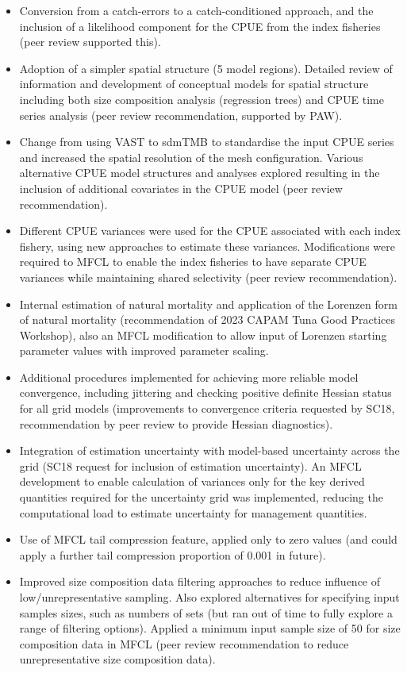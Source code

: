 \begin{itemize}
  \item Conversion from a catch-errors to a catch-conditioned approach, and the inclusion of a likelihood component for the CPUE from the index fisheries (peer review supported this).
  \item Adoption of a simpler spatial structure (5 model regions). Detailed review of information and development of conceptual models for spatial structure including both size composition analysis (regression trees) and CPUE time series analysis (peer review recommendation, supported by PAW).
  \item Change from using VAST to sdmTMB to standardise the input CPUE series and increased the spatial resolution of the mesh configuration. Various alternative CPUE model structures and analyses explored resulting in the inclusion of additional covariates in the CPUE model (peer review recommendation).
  \item Different CPUE variances were used for the CPUE associated with each index fishery, using new approaches to estimate these variances. Modifications were required to MFCL to enable the index fisheries to have separate CPUE variances while maintaining shared selectivity  (peer review recommendation).
  \item Internal estimation of natural mortality and application of the Lorenzen form of natural mortality (recommendation of 2023 CAPAM Tuna Good Practices Workshop), also an MFCL modification to allow input of Lorenzen starting parameter values with improved parameter scaling.
  \item Additional procedures implemented for achieving more reliable model convergence, including jittering and checking positive definite Hessian status for all grid models (improvements to convergence criteria requested by SC18, recommendation by peer review to provide Hessian diagnostics).
  \item Integration of estimation uncertainty with model-based uncertainty across the grid (SC18 request for inclusion of estimation uncertainty). An MFCL development to enable calculation of variances only for the key derived quantities required for the uncertainty grid was implemented, reducing the computational load to estimate uncertainty for management quantities.
  \item Use of MFCL tail compression feature, applied only to zero values (and could apply a further tail compression proportion of 0.001 in future).
  \item Improved size composition data filtering approaches to reduce influence of low/unrepresentative sampling. Also explored alternatives for specifying input samples sizes, such as numbers of sets (but ran out of time to fully explore a range of filtering options). Applied a minimum input sample size of 50 for size composition data in MFCL (peer review recommendation to reduce unrepresentative size composition data).

\end{itemize}
